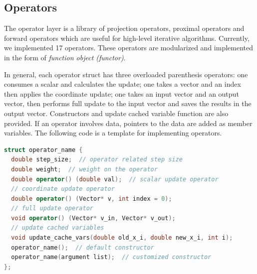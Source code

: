 \subsection{Operators}
The operator layer is a library of projection operators, proximal operators and forward operators which are useful for high-level iterative algorithms. Currently, we implemented 17 operators. These operators are modularized and implemented in the form of \emph{function object (functor)}. 

In general, each operator struct has three overloaded parenthesis operators: one consumes a scalar and calculates the update; one takes a vector and an index then applies the coordinate update; one takes an input vector and an output vector, then performs full update to the input vector and saves the results in the output vector. Constructors and update cached variable function are also provided. If an operator involves data, pointers to the data are added as member variables. The following code is a template for implementing operators.
\begin{lstlisting}[language=C++]
struct operator_name {
  double step_size;  // operator related step size
  double weight;  // weight on the operator  
  double operator() (double val);  // scalar update operator  
  // coordinate update operator
  double operator() (Vector* v, int index = 0);  
  // full update operator
  void operator() (Vector* v_in, Vector* v_out); 
  // update cached variables
  void update_cache_vars(double old_x_i, double new_x_i, int i);
  operator_name();  // default constructor
  operator_name(argument list);  // customized constructor
};
\end{lstlisting}



